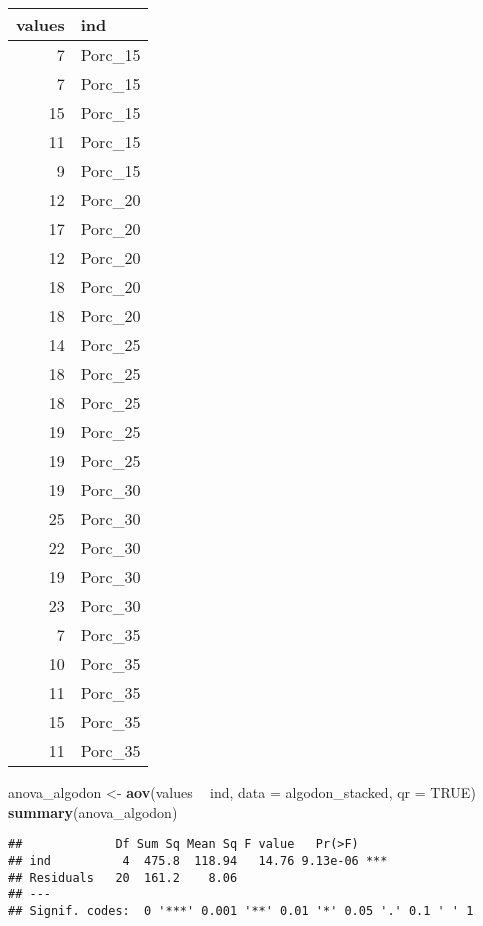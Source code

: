 \documentclass[]{article}
\newenvironment{Shaded}{\begin{snugshade}}{\end{snugshade}}
\newcommand{\KeywordTok}[1]{\textcolor[rgb]{0.13,0.29,0.53}{\textbf{#1}}}
\newcommand{\DataTypeTok}[1]{\textcolor[rgb]{0.13,0.29,0.53}{#1}}
\newcommand{\StringTok}[1]{\textcolor[rgb]{0.31,0.60,0.02}{#1}}
\newcommand{\OtherTok}[1]{\textcolor[rgb]{0.56,0.35,0.01}{#1}}
\newcommand{\OperatorTok}[1]{\textcolor[rgb]{0.81,0.36,0.00}{\textbf{#1}}}
\newcommand{\NormalTok}[1]{#1}
\begin{document}
\begin{tabular}{r|l}
\hline
values & ind\\
\hline
7 & Porc\_15\\
\hline
7 & Porc\_15\\
\hline
15 & Porc\_15\\
\hline
11 & Porc\_15\\
\hline
9 & Porc\_15\\
\hline
12 & Porc\_20\\
\hline
17 & Porc\_20\\
\hline
12 & Porc\_20\\
\hline
18 & Porc\_20\\
\hline
18 & Porc\_20\\
\hline
14 & Porc\_25\\
\hline
18 & Porc\_25\\
\hline
18 & Porc\_25\\
\hline
19 & Porc\_25\\
\hline
19 & Porc\_25\\
\hline
19 & Porc\_30\\
\hline
25 & Porc\_30\\
\hline
22 & Porc\_30\\
\hline
19 & Porc\_30\\
\hline
23 & Porc\_30\\
\hline
7 & Porc\_35\\
\hline
10 & Porc\_35\\
\hline
11 & Porc\_35\\
\hline
15 & Porc\_35\\
\hline
11 & Porc\_35\\
\hline
\end{tabular}

\begin{Shaded}
\begin{Highlighting}[]
\NormalTok{anova_algodon <-}\StringTok{ }\KeywordTok{aov}\NormalTok{(values }\OperatorTok{~}\StringTok{ }\NormalTok{ind, }\DataTypeTok{data =}\NormalTok{ algodon_stacked, }\DataTypeTok{qr =} \OtherTok{TRUE}\NormalTok{)}
\KeywordTok{summary}\NormalTok{(anova_algodon)}
\end{Highlighting}
\end{Shaded}

\begin{verbatim}
##             Df Sum Sq Mean Sq F value   Pr(>F)    
## ind          4  475.8  118.94   14.76 9.13e-06 ***
## Residuals   20  161.2    8.06                     
## ---
## Signif. codes:  0 '***' 0.001 '**' 0.01 '*' 0.05 '.' 0.1 ' ' 1
\end{verbatim}
\end{document}
